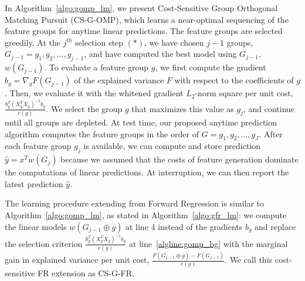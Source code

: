 In Algorithm~\ref{algo:gomp_lm}, we present Cost-Sensitive Group Orthogonal Matching Pursuit (CS-G-OMP), which learns a near-optimal sequencing of the
feature groups for anytime linear predictions. 
The feature groups are selected greedily. At the $j^{th}$ selection step $(*)$, we have chosen $j-1$ groups,
$G_{j-1} = g_1, g_2, ..., g_{j-1}$, and have computed 
the best model using $G_{j-1}$, $w(G_{j-1})$. 
To evaluate a feature group $g$,
we first compute the gradient $b_g = \nabla _g F(G_{j-1})$ of the 
explained variance $F$ with respect to the coefficients of $g$.
Then, we evaluate it with the whitened gradient $L_2$-norm square per unit cost, 
$\frac{b_g ^T (X_{g}^TX_g)^{-1}b_g}{ c(g) }$. We select the group $g$ that 
maximizes this value as $g_j$, and continue until all groups
are depleted. At test time, our proposed anytime prediction algorithm computes the feature groups in the order of $G = g_1, g_2, ..., g_J$. After each feature group $g_j$ is available, we can compute and store prediction $\hat{y} = x^Tw(G_j)$ because we assumed that 
the costs of feature generation dominate the computations of linear predictions. At interruption,
we can then report the latest prediction $\hat{y}$. 

The learning procedure extending from Forward Regression is similar to
Algorithm~\ref{algo:gomp_lm}, as stated in Algorithm~\ref{algo:gfr_lm}: we compute the linear models 
$w(G_{j-1} \oplus g)$ at line 4 instead of the 
gradients $b_g$ and replace the selection criterion $\frac{b_g ^T (X_{g}^TX_g)^{-1}b_g}{ c(g) }$ at line~\ref{algline:gomp_bg} with the marginal gain in explained 
variance per unit cost, $\frac{F(G_{j-1} \oplus g) - F(G_{j-1}) }{c(g)}$. We call this cost-sensitive FR extension as CS-G-FR.


